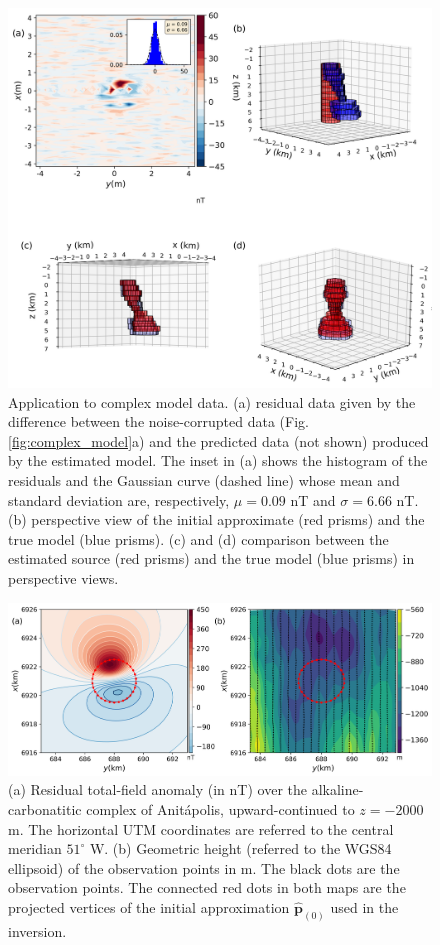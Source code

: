 \begin{figure}
    \centering
    \includegraphics[scale=.5]{figures/complex_results.png}
    \caption{Application to complex model data. (a) residual data given by the difference between the noise-corrupted data (Fig. \ref{fig:complex_model}a) and the predicted data (not shown) produced by the estimated model. The inset in (a) shows the histogram of the residuals and the Gaussian curve (dashed line) whose mean and standard deviation are, respectively, $\mu = 0.09$ nT and $\sigma=6.66$ nT. (b) perspective view of the initial approximate (red prisms) and the true model (blue prisms). (c) and (d) comparison between the estimated source (red prisms) and the true model (blue prisms) in perspective views. 
}
    \label{fig:complex_result}
\end{figure}


\begin{figure}
    \centering
    \includegraphics[scale=.5]{figures/real_updata.png}
    \caption{(a) Residual total-field anomaly (in nT) over the alkaline-carbonatitic 
    complex of Anitápolis, upward-continued to $z = -2000$ m. The horizontal UTM 
    coordinates are referred to the central meridian $ 51^\circ $ W. (b) Geometric 
    height (referred to the WGS84 ellipsoid) of the observation points in m. 
    The black dots are the observation points. The connected red dots in both maps 
    are the projected vertices of the initial approximation $\hat{\mathbf{p}}_{(0)}$ 
    used in the inversion.}
    \label{fig:real_data}
\end{figure}

